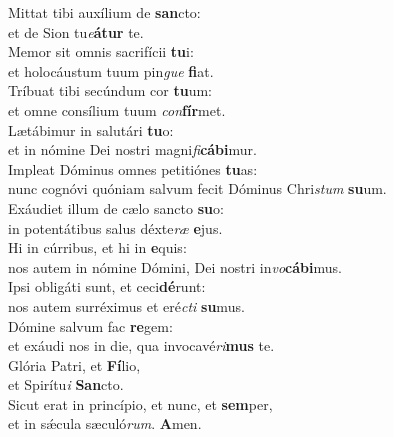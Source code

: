 \evenverse Mittat tibi auxílium de \textbf{san}cto:~\*\\
\evenverse et de Sion tu\textit{e}\textbf{á}\textbf{tur} te.\\
\oddverse Memor sit omnis sacrifícii \textbf{tu}i:~\*\\
\oddverse et holocáustum tuum pin\textit{gue} \textbf{fi}at.\\
\evenverse Tríbuat tibi secúndum cor \textbf{tu}um:~\*\\
\evenverse et omne consílium tuum \textit{con}\textbf{fír}met.\\
\oddverse Lætábimur in salutári \textbf{tu}o:~\*\\
\oddverse et in nómine Dei nostri magni\textit{fi}\textbf{cá}\textbf{bi}mur.\\
\evenverse Impleat Dóminus omnes petitiónes \textbf{tu}as:~\*\\
\evenverse nunc cognóvi quóniam salvum fecit Dóminus Chri\textit{stum} \textbf{su}um.\\
\oddverse Exáudiet illum de cælo sancto \textbf{su}o:~\*\\
\oddverse in potentátibus salus déxte\textit{ræ} \textbf{e}jus.\\
\evenverse Hi in cúrribus, et hi in \textbf{e}quis:~\*\\
\evenverse nos autem in nómine Dómini, Dei nostri in\textit{vo}\textbf{cá}\textbf{bi}mus.\\
\oddverse Ipsi obligáti sunt, et ceci\textbf{dé}runt:~\*\\
\oddverse nos autem surréximus et eré\textit{cti} \textbf{su}mus.\\
\evenverse Dómine salvum fac \textbf{re}gem:~\*\\
\evenverse et exáudi nos in die, qua invocavé\textit{ri}\textbf{mus} te.\\
\oddverse Glória Patri, et \textbf{Fí}lio,~\*\\
\oddverse et Spirítu\textit{i} \textbf{San}cto.\\
\evenverse Sicut erat in princípio, et nunc, et \textbf{sem}per,~\*\\
\evenverse et in sǽcula sæculó\textit{rum}. \textbf{A}men.\\
